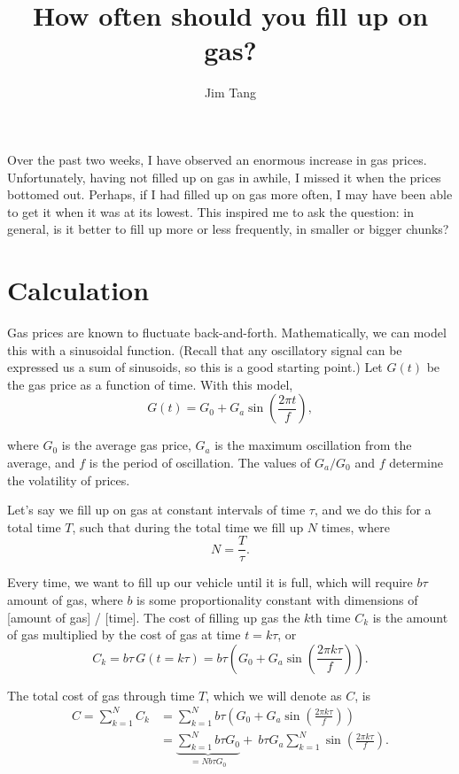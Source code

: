 \documentclass[11pt]{article}
\title{How often should you fill up on gas?}
\author{Jim Tang}
\begin{document}
  \maketitle

Over the past two weeks, I have observed an enormous increase in gas prices. Unfortunately, having not filled up on gas in awhile, I missed it when the prices bottomed out. Perhaps, if I had filled up on gas more often, I may have been able to get it when it was at its lowest. This inspired me to ask the question: in general, is it better to fill up more or less frequently, in smaller or bigger chunks?

\section*{Calculation}
\label{sec:calculation}

Gas prices are known to fluctuate back-and-forth. Mathematically, we can model this with a sinusoidal function. (Recall that any oscillatory signal can be expressed us a sum of sinusoids, so this is a good starting point.) Let $G(t)$ be the gas price as a function of time. With this model,
\begin{equation}
G(t) = G_0 + G_a \sin \left( \frac{2 \pi t}{f}\right) \label{eq:gas_prices},
\end{equation}

where $G_0$ is the average gas price, $G_a$ is the maximum oscillation from the average, and $f$ is the period of oscillation. The values of $G_a / G_0$ and $f$ determine the volatility of prices.

\par Let's say we fill up on gas at constant intervals of time $\tau$, and we do this for a total time $T$, such that during the total time we fill up $N$ times, where
 $$N = \frac{T}{\tau}.$$ 

Every time, we want to fill up our vehicle until it is full, which will require $b \tau$ amount of gas, where $b$ is some proportionality constant with dimensions of [amount of gas] / [time]. The cost of filling up gas the $k$th time $C_k$ is the amount of gas multiplied by the cost of gas at time $t = k \tau$, or
\begin{equation}
C_k = b\tau \, G(t = k \tau) = b\tau \left( G_0 + G_a \sin \left( \frac{2 \pi k \tau}{f}\right) \right).
\end{equation}

The total cost of gas through time $T$, which we will denote as $C$, is
\begin{align}
C = \sum_{k=1}^{N}{C_k} &= \sum_{k=1}^{N}{ b\tau \left( G_0 + G_a \sin \left( \frac{2 \pi k \tau}{f}\right) \right)} \nonumber \\ 
 &= \underbrace{\sum_{k=1}^{N}{ b\tau G_0}}_{=Nb \tau G_0} + \: b \tau G_a \sum_{k=1}^{N} \sin \left( \frac{2 \pi k \tau}{f}\right). \label{eq:sum_C_k}
\end{align}
\end{document}
